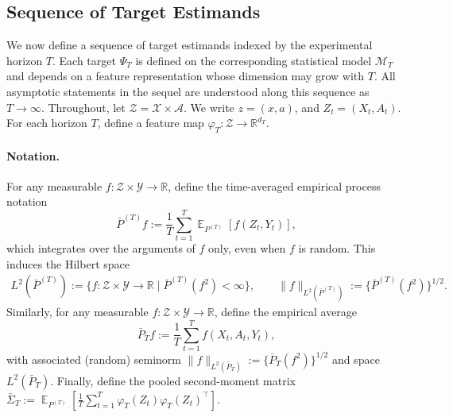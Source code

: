 \documentclass[11pt]{article}
\DeclareMathOperator{\E}{\mathbb{E}}
\begin{document}
\subsection{Sequence of Target Estimands}

We now define a sequence of target estimands indexed by the experimental horizon $T$.
Each target $\Psi_T$ is defined on the corresponding statistical model
$\mathcal M_T$ and depends on a feature representation whose dimension may grow with $T$.
All asymptotic statements in the sequel are understood along this sequence as $T \to \infty$. Throughout, let $\mathcal{Z} = \mathcal{X}\times \mathcal{A}$. We write $z = (x,a)$, and $Z_t = (X_t, A_t)$. For each horizon $T$, define a feature map
$\varphi_T : \mathcal{Z} \to \mathbb R^{d_T}$.

\paragraph{Notation.}
For any measurable $f:\mathcal Z\times\mathcal Y\to\mathbb R$, define the time-averaged empirical process notation
\[
\bar P^{(T)}f:=\frac1T\sum_{t=1}^T\E_{P^{(T)}}[f(Z_t,Y_t)],
\]
which integrates over the arguments of $f$ only, even when $f$ is random. This induces the Hilbert space
\begin{align}
\label{eq: l2_bar_pt_defn}
    L^2(\bar P^{(T)}):=\{f:\mathcal Z\times\mathcal Y\to\mathbb R\mid \bar P^{(T)}(f^2)<\infty\},
\qquad
\|f\|_{L^2(\bar P^{(T)})}:=\{\bar P^{(T)}(f^2)\}^{1/2}.
\end{align}
Similarly, for any measurable $f:\mathcal Z\times\mathcal Y\to\mathbb R$, define the empirical average
\[
\bar P_T f:=\frac1T\sum_{t=1}^T f(X_t,A_t,Y_t),
\]
with associated (random) seminorm $\|f\|_{L^2(\bar P_T)}:=\{\bar P_T(f^2)\}^{1/2}$ and space $L^2(\bar P_T)$. Finally, define the pooled second-moment matrix $\bar\Sigma_T:=\E_{P^{(T)}}\!\left[\frac1T\sum_{t=1}^T\varphi_T(Z_t)\varphi_T(Z_t)^\top\right]$. 
\end{document}
